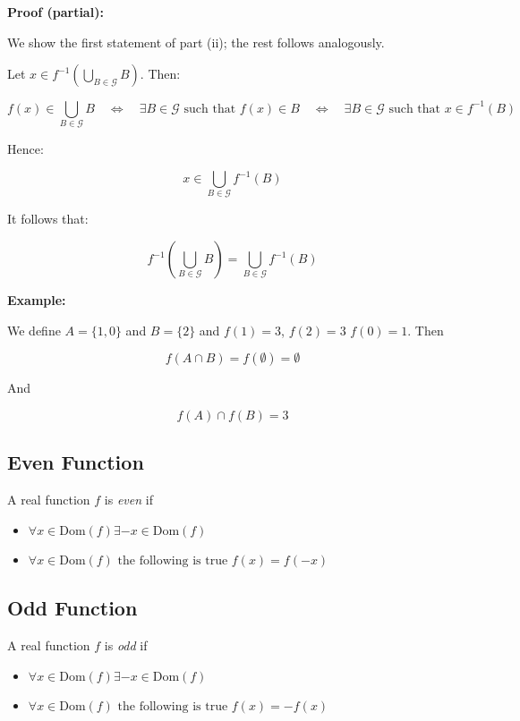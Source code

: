 \textbf{Proof (partial):}

We show the first statement of part (ii); the rest follows analogously.

Let \( x \in f^{-1} \left( \bigcup_{B \in \mathcal{G}} B \right) \). Then:

\[
	f(x) \in \bigcup_{B \in \mathcal{G}} B
	\quad \Leftrightarrow \quad
	\exists B \in \mathcal{G} \text{ such that } f(x) \in B
	\quad \Leftrightarrow \quad
	\exists B \in \mathcal{G} \text{ such that } x \in f^{-1}(B)
\]

Hence:

\[
	x \in \bigcup_{B \in \mathcal{G}} f^{-1}(B)
\]

It follows that:

\[
	f^{-1} \left( \bigcup_{B \in \mathcal{G}} B \right) = \bigcup_{B \in \mathcal{G}} f^{-1}(B)
\]

\QED

\textbf{Example:}

We define \(A = \{1, 0\}\) and \(B = \{2\}\) and \(f(1) = 3\), \(f(2) = 3\) \(f(0) = 1\). Then 

\[
	f(A \cap B) = f( \emptyset) = \emptyset
\]

And 

\[
	f(A) \cap f(B) = 3
\]

\subsection{Even Function}

A real function \(f\) is \emph{even} if

\begin{itemize}
	
	\item \(\forall x \in \text{Dom}(f) \exists -x \in \text{Dom}(f)\)
	
	\item \(\forall x \in \text{Dom}(f) \text{ the following is true } f(x) = f(-x)\)

\end{itemize}

\subsection{Odd Function}

A real function \(f\) is \emph{odd} if

\begin{itemize}
	
	\item \(\forall x \in \text{Dom}(f) \exists -x \in \text{Dom}(f)\)
	
	\item \(\forall x \in \text{Dom}(f) \text{ the following is true } f(x) = - f(x)\)

\end{itemize}

